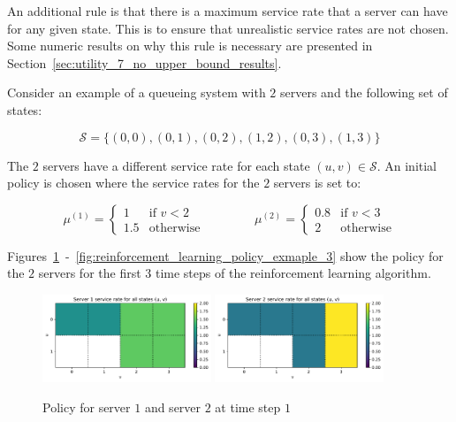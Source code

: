 An additional rule is that there is a maximum service rate that a server can
have for any given state.
This is to ensure that unrealistic service rates are not chosen.
Some numeric results on why this rule is necessary are presented in
Section~\ref{sec:utility_7_no_upper_bound_results}.

Consider an example of a queueing system with \(2\) servers and the following
set of states:

\begin{equation}
    \mathcal{S} = \{(0, 0), (0, 1), (0, 2), (1, 2), (0, 3), (1, 3)\}
\end{equation}

The \(2\) servers have a different service rate for each state
\((u, v) \in \mathcal{S}\).
An initial policy is chosen where the service rates for the \(2\) servers is
set to:

\begin{equation*}
    \mu^{(1)} =
    \begin{cases}
        1 & \text{if } v < 2 \\
        1.5 & \text{otherwise}
    \end{cases}
    \qquad \qquad
    \mu^{(2)} =
    \begin{cases}
        0.8 & \text{if } v < 3 \\
        2 & \text{otherwise}
    \end{cases}
\end{equation*}

Figures~\ref{fig:reinforcement_learning_policy_exmaple_1}~-~\ref{fig:reinforcement_learning_policy_exmaple_3} show the
policy for the \(2\) servers for the first \(3\) time steps of the
reinforcement learning algorithm.

\begin{figure}[H]
    \includegraphics[width=0.45\textwidth]{chapters/06_agent_based_extension/Bin/reinforcement_learning_policy_example/server_1_1.pdf}
    \includegraphics[width=0.45\textwidth]{chapters/06_agent_based_extension/Bin/reinforcement_learning_policy_example/server_2_1.pdf}
    \caption{Policy for server \(1\) and server \(2\) at time step \(1\)}
    \label{fig:reinforcement_learning_policy_exmaple_1}
\end{figure}


